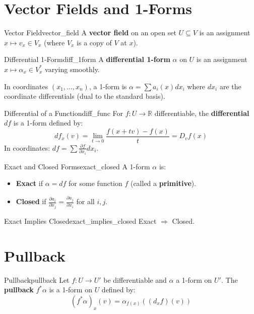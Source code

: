\documentclass[11pt, letterpaper, openany]{book}
\begin{document}
\section{Vector Fields and 1-Forms}

\begin{defn}{Vector Field}{vector_field}
A \textbf{vector field} on an open set $U \subseteq V$ is an assignment $x \mapsto v_x \in V_x$ (where $V_x$ is a copy of $V$ at $x$).
\end{defn}

\begin{defn}{Differential 1-Form}{diff_1form}
A \textbf{differential 1-form} $\alpha$ on $U$ is an assignment $x \mapsto \alpha_x \in V_x^*$ varying smoothly.
\end{defn}

In coordinates $(x_1, \ldots, x_n)$, a 1-form is $\alpha = \sum a_i(x) dx_i$ where $dx_i$ are the coordinate differentials (dual to the standard basis).

\begin{defn}{Differential of a Function}{diff_func}
For $f: U \to \mathbb{R}$ differentiable, the \textbf{differential} $df$ is a 1-form defined by:
\[
df_x(v) = \lim_{t \to 0} \frac{f(x + tv) - f(x)}{t} = D_v f(x)
\]
In coordinates: $df = \sum \frac{\partial f}{\partial x_i} dx_i$.
\end{defn}

\begin{defn}{Exact and Closed Forms}{exact_closed}
A 1-form $\alpha$ is:
\begin{itemize}
    \item \textbf{Exact} if $\alpha = df$ for some function $f$ (called a \textbf{primitive}).
    \item \textbf{Closed} if $\frac{\partial a_i}{\partial x_j} = \frac{\partial a_j}{\partial x_i}$ for all $i, j$.
\end{itemize}
\end{defn}

\begin{thm}{Exact Implies Closed}{exact_implies_closed}
Exact $\Rightarrow$ Closed.
\end{thm}

\section{Pullback}

\begin{defn}{Pullback}{pullback}
Let $f: U \to U'$ be differentiable and $\alpha$ a 1-form on $U'$. The \textbf{pullback} $f^*\alpha$ is a 1-form on $U$ defined by:
\[
(f^*\alpha)_x(v) = \alpha_{f(x)}((d_x f)(v))
\]
\end{defn}
\end{document}
